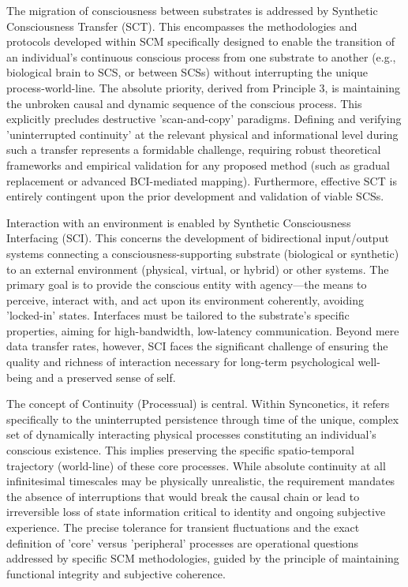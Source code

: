 \documentclass[10pt]{article}
\begin{document}
\begin{sloppypar}
  The migration of consciousness between substrates is addressed by Synthetic Consciousness Transfer (SCT). This encompasses the methodologies and protocols developed within SCM specifically designed to enable the transition of an individual's continuous conscious process from one substrate to another (e.g., biological brain to SCS, or between SCSs) without interrupting the unique process-world-line. The absolute priority, derived from Principle 3, is maintaining the unbroken causal and dynamic sequence of the conscious process. This explicitly precludes destructive 'scan-and-copy' paradigms. Defining and verifying 'uninterrupted continuity' at the relevant physical and informational level during such a transfer represents a formidable challenge, requiring robust theoretical frameworks and empirical validation for any proposed method (such as gradual replacement or advanced BCI-mediated mapping). Furthermore, effective SCT is entirely contingent upon the prior development and validation of viable SCSs.

  Interaction with an environment is enabled by Synthetic Consciousness Interfacing (SCI). This concerns the development of bidirectional input/output systems connecting a consciousness-supporting substrate (biological or synthetic) to an external environment (physical, virtual, or hybrid) or other systems. The primary goal is to provide the conscious entity with agency—the means to perceive, interact with, and act upon its environment coherently, avoiding 'locked-in' states. Interfaces must be tailored to the substrate's specific properties, aiming for high-bandwidth, low-latency communication. Beyond mere data transfer rates, however, SCI faces the significant challenge of ensuring the quality and richness of interaction necessary for long-term psychological well-being and a preserved sense of self.

  The concept of Continuity (Processual) is central. Within Synconetics, it refers specifically to the uninterrupted persistence through time of the unique, complex set of dynamically interacting physical processes constituting an individual's conscious existence. This implies preserving the specific spatio-temporal trajectory (world-line) of these core processes. While absolute continuity at all infinitesimal timescales may be physically unrealistic, the requirement mandates the absence of interruptions that would break the causal chain or lead to irreversible loss of state information critical to identity and ongoing subjective experience. The precise tolerance for transient fluctuations and the exact definition of 'core' versus 'peripheral' processes are operational questions addressed by specific SCM methodologies, guided by the principle of maintaining functional integrity and subjective coherence.


\end{sloppypar}
\end{document}
